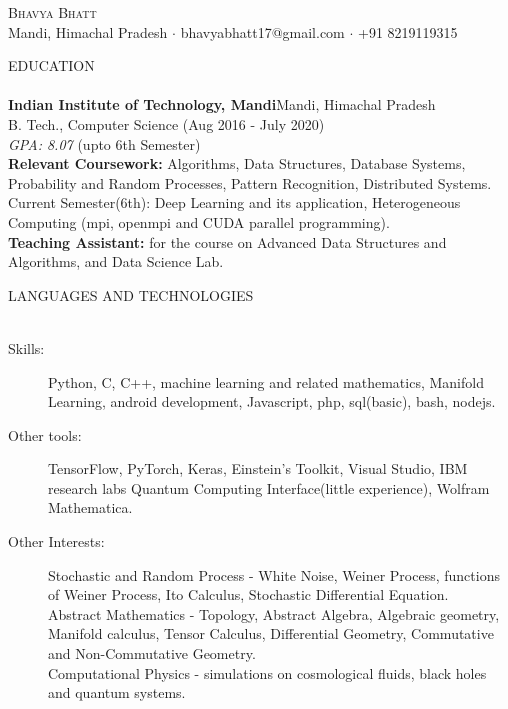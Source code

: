 \documentclass[a4paper]{article}
\newcommand{\lineunder} {
    \vspace*{-8pt} \\
    \hspace*{-18pt} \hrulefill \\
}
\newcommand{\header} [1] {
    {\hspace*{-18pt}\vspace*{6pt} \textsc{#1}}
    \vspace*{-6pt} \lineunder
}
\begin{document}
\vspace*{-40pt}

    

\vspace*{-10pt}
\begin{center}
    {\Huge \scshape {Bhavya Bhatt}}\\
    Mandi, Himachal Pradesh $\cdot$ bhavyabhatt17@gmail.com $\cdot$ +91 8219119315\\
\end{center}

\header{EDUCATION}
\textbf{Indian Institute of Technology, Mandi}\hfill Mandi, Himachal Pradesh\\
B. Tech., Computer Science (Aug 2016 - July 2020)\\
 \textit{GPA: 8.07} (upto 6th Semester)\\
\vspace{2mm}
\textbf{Relevant Coursework:}
Algorithms, Data Structures, Database Systems, Probability and Random
Processes, Pattern Recognition, Distributed Systems. \\
Current Semester(6th): Deep Learning and its application, Heterogeneous Computing (mpi, openmpi and CUDA parallel programming). \\
\vspace{2mm}
\textbf{Teaching Assistant:}
for the course on Advanced Data Structures and Algorithms, and Data Science Lab.\\
\vspace{2mm}

\header{LANGUAGES AND TECHNOLOGIES}
\begin{description}
\item [Skills:] Python, C, C++, machine learning and related mathematics, Manifold
Learning, android development, Javascript, php, sql(basic), bash, nodejs.
\item [Other tools:] TensorFlow, PyTorch, Keras, Einstein’s Toolkit, Visual Studio, IBM research labs Quantum Computing Interface(little experience), Wolfram Mathematica.
\item [Other Interests:] Stochastic and Random Process - White Noise, Weiner Process, functions of
Weiner Process, Ito Calculus, Stochastic Differential Equation.\\
Abstract Mathematics - Topology, Abstract Algebra, Algebraic geometry, Manifold calculus,
Tensor Calculus, Differential Geometry, Commutative and Non-Commutative Geometry.\\
Computational Physics - simulations on cosmological fluids, black holes and quantum systems.
\end{description}
\vspace{2mm}
\end{document}
